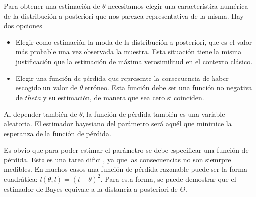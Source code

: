 Para obtener una estimaci\'on de $\theta$ necesitamos elegir una caracter\'istica num\'erica de la distribuci\'on a posteriori que nos parezca representativa de la misma. Hay dos opciones:
\begin{itemize}
\item Elegir como estimaci\'on la moda de la distribuci\'on a posteriori, que es el valor m\'as probable una vez observada la muestra. Esta situaci\'on tiene la misma justificaci\'on que la estimaci\'on de m\'axima verosimilitud en el contexto cl\'asico.
\item Elegir una funci\'on de p\'erdida que represente la consecuencia de haber escogido un valor de $\theta$ err\'oneo. Esta funci\'on debe ser una funci\'on no negativa de $theta$ y su estimaci\'on, de manera que sea cero si coinciden.
\end{itemize}

Al depender tambi\'en de $\theta$, la funci\'on de p\'erdida tambi\'en es una variable aleatoria. El estimador bayesiano del par\'ametro ser\'a aqu\'el que minimice la esperanza de la funci\'on de p\'erdida.

Es obvio que para poder estimar el par\'ametro se debe especificar una funci\'on de p\'erdida. Esto es una tarea dif\'icil, ya que las consecuencias no son siemrpre medibles. En muchos casos una funci\'on de p\'erdida razonable puede ser la forma cuadr\'atica: $l(\theta, l)=(t-\theta)^2$. Para esta forma, se puede demostrar que el estimador de Bayes equivale a la distancia a posteriori de $\Theta$.